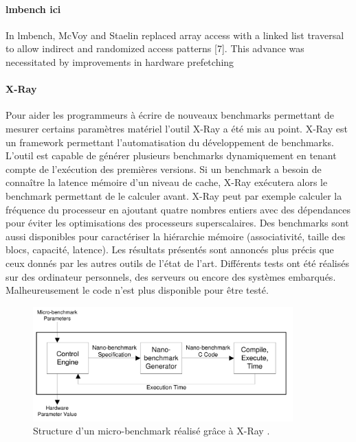\paragraph{lmbench ici}
In lmbench, McVoy and Staelin replaced array access with
a linked list traversal to allow indirect and randomized access
patterns [7]. This advance was necessitated by improvements
in hardware prefetching

\paragraph{X-Ray \cite{Yotov2004}} Pour aider les programmeurs à écrire de nouveaux benchmarks permettant de mesurer certains paramètres matériel l'outil X-Ray a été mis au point. X-Ray est un framework permettant l'automatisation du développement de benchmarks. L'outil est capable de générer plusieurs benchmarks dynamiquement en tenant compte de l'exécution des premières versions. Si un benchmark a besoin de connaître la latence mémoire d'un niveau de cache, X-Ray exécutera alors le benchmark permettant de le calculer avant. X-Ray peut par exemple calculer la fréquence du processeur en ajoutant quatre nombres entiers avec des dépendances pour éviter les optimisations des processeurs superscalaires. Des benchmarks sont aussi disponibles pour caractériser la hiérarchie mémoire (associativité, taille des blocs, capacité, latence). Les résultats présentés sont annoncés plus précis que ceux donnés par les autres outils de l'état de l'art. Différents tests ont été réalisés sur des ordinateur personnels, des serveurs ou encore des systèmes embarqués. Malheureusement le code n'est plus disponible pour être testé. 

\begin{figure}
    \center
    \includegraphics[width=10cm]{images/bench_xray.png}
    \caption{ Structure d'un micro-benchmark réalisé grâce à X-Ray  \cite{Yotov2004}.
    \label{pic_bench_xray}}
\end{figure}


